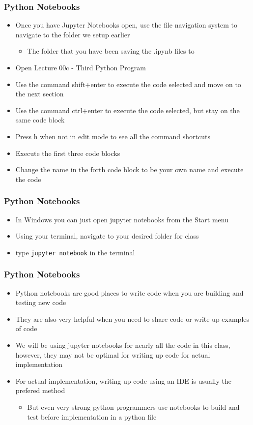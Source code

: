 \documentclass[mini frame in current subsection]{beamer}
\begin{document}
		\begin{frame}
			\frametitle{Python Notebooks}
			\begin{itemize}
				\vfill \item  Once you have Jupyter Notebooks open, use the file navigation system to navigate to the folder we setup earlier
					\begin{itemize}
						\item  The folder that you have been saving the .ipynb files to
					\end{itemize}
				\vfill\item  Open Lecture 00c - Third Python Program
				\vfill\item  Use the command shift+enter to execute the code selected and move on to the next section
				\vfill\item  Use the command ctrl+enter to execute the code selected, but stay on the same code block
				\vfill\item  Press h when not in edit mode to see all the command shortcuts
				\vfill\item  Execute the first three code blocks
				\vfill\item  Change the name in the forth code block to be your own name and execute the code
			\end{itemize}
		\end{frame}
	
		\begin{frame}
			\frametitle{Python Notebooks}
			\begin{itemize}
				\vfill \item  In Windows you can just open jupyter notebooks from the Start menu
				\vfill \item  Using your terminal, navigate to your desired folder for class
				\vfill \item  type \texttt{jupyter notebook} in the terminal
			\end{itemize}
		\end{frame}
	
		\begin{frame}
			\frametitle{Python Notebooks}
			\begin{itemize}
				\vfill \item  Python notebooks are good places to write code when you are building and testing new code
				\vfill\item  They are also very helpful when you need to share code or write up examples of code
				\vfill\item  We will be using jupyter notebooks for nearly all the code in this class, however, they may not be optimal for writing up code for actual implementation
				\vfill\item  For actual implementation, writing up code using an IDE is usually the prefered method
					\begin{itemize}
						\item  But even very strong python programmers use notebooks to build and test before implementation in a python file
					\end{itemize}
			\end{itemize}
		\end{frame}
		
\end{document}
